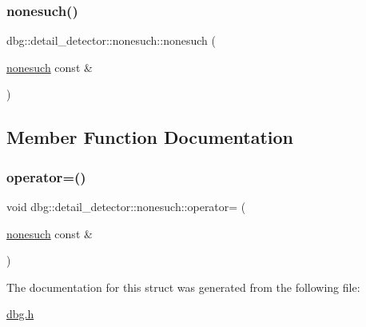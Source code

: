 \subsubsection{\texorpdfstring{nonesuch()}{nonesuch()}\hspace{0.1cm}{\footnotesize\ttfamily [2/2]}}
{\footnotesize\ttfamily dbg\+::detail\+\_\+detector\+::nonesuch\+::nonesuch (\begin{DoxyParamCaption}\item[{\hyperlink{structdbg_1_1detail__detector_1_1nonesuch}{nonesuch} const \&}]{ }\end{DoxyParamCaption})\hspace{0.3cm}{\ttfamily [delete]}}



\subsection{Member Function Documentation}
\mbox{\label{structdbg_1_1detail__detector_1_1nonesuch_af0d1b2ab32ace678e2c9d95684d1917b}} 
\subsubsection{\texorpdfstring{operator=()}{operator=()}}
{\footnotesize\ttfamily void dbg\+::detail\+\_\+detector\+::nonesuch\+::operator= (\begin{DoxyParamCaption}\item[{\hyperlink{structdbg_1_1detail__detector_1_1nonesuch}{nonesuch} const \&}]{ }\end{DoxyParamCaption})\hspace{0.3cm}{\ttfamily [delete]}}



The documentation for this struct was generated from the following file\+:\begin{DoxyCompactItemize}
\item 
\hyperlink{dbg_8h}{dbg.\+h}\end{DoxyCompactItemize}
